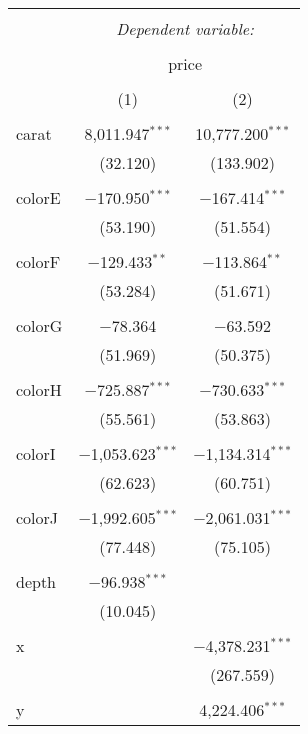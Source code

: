 
\begin{tabular}{@{\extracolsep{5pt}}lcc} 
\\[-1.8ex]\hline 
\hline \\[-1.8ex] 
 & \multicolumn{2}{c}{\textit{Dependent variable:}} \\ 
\cline{2-3} 
\\[-1.8ex] & \multicolumn{2}{c}{price} \\ 
\\[-1.8ex] & (1) & (2)\\ 
\hline \\[-1.8ex] 
 carat & 8,011.947$^{***}$ & 10,777.200$^{***}$ \\ 
  & (32.120) & (133.902) \\ 
  & & \\ 
 colorE & $-$170.950$^{***}$ & $-$167.414$^{***}$ \\ 
  & (53.190) & (51.554) \\ 
  & & \\ 
 colorF & $-$129.433$^{**}$ & $-$113.864$^{**}$ \\ 
  & (53.284) & (51.671) \\ 
  & & \\ 
 colorG & $-$78.364 & $-$63.592 \\ 
  & (51.969) & (50.375) \\ 
  & & \\ 
 colorH & $-$725.887$^{***}$ & $-$730.633$^{***}$ \\ 
  & (55.561) & (53.863) \\ 
  & & \\ 
 colorI & $-$1,053.623$^{***}$ & $-$1,134.314$^{***}$ \\ 
  & (62.623) & (60.751) \\ 
  & & \\ 
 colorJ & $-$1,992.605$^{***}$ & $-$2,061.031$^{***}$ \\ 
  & (77.448) & (75.105) \\ 
  & & \\ 
 depth & $-$96.938$^{***}$ &  \\ 
  & (10.045) &  \\ 
  & & \\ 
 x &  & $-$4,378.231$^{***}$ \\ 
  &  & (267.559) \\ 
  & & \\ 
 y &  & 4,224.406$^{***}$ \\ 

\end{tabular}
